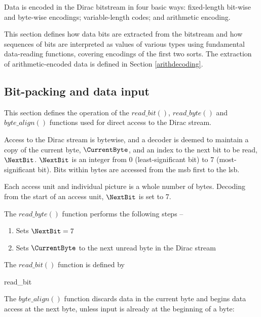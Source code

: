 
Data is encoded in the Dirac bitstream in four basic ways: fixed-length
bit-wise and byte-wise encodings; variable-length codes; and arithmetic encoding.

This section defines how data bits are extracted from the bitstream and how
sequences of bits are interpreted as values of various types using fundamental
data-reading functions, covering encodings of the first two sorts. The extraction
of arithmetic-encoded data is defined in Section \ref{arithdecoding}.

\subsection{Bit-packing and data input}
\label{bitpacking}

This section defines the operation of the $read\_bit()$, $read\_byte()$ 
and $byte\_align()$ functions used for direct access to the Dirac stream.

Access to the Dirac stream is bytewise, and a decoder is deemed to maintain
a copy of the current byte, $\CurrentByte$, and an index to the next bit
to be read, $\NextBit$. $\NextBit$ is an integer from 0 (least-significant bit) to 7 
(most-significant bit). Bits within bytes are accessed from the msb first to the
lsb.

Each access unit and individual picture is a whole number of bytes. Decoding from the
start of an access unit, $\NextBit$ is set to 7.

The $read\_byte()$ function performs the following steps --
\begin{enumerate}
\item Sets $\NextBit=7$ 
\item Sets $\CurrentByte$ to the next unread byte in the Dirac stream
\end{enumerate}

The $read\_bit()$ function is defined by

\begin{pseudo}{read\_bit}{}
\bsEND
{}
\bsEND
{}
\end{pseudo}

The $byte\_align()$ function discards data in the current byte and begins data access
at the next byte, unless input is already at the beginning of a byte: 

